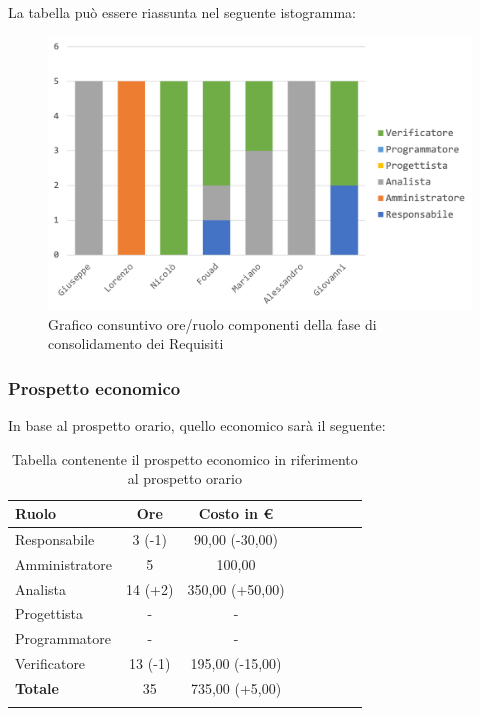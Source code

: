 			La tabella può essere riassunta nel seguente istogramma:
			
			\begin{figure}[H]
				\centering
				\includegraphics[width=0.8\linewidth]{images/consuntivo/ConsReqCons.png}
				\caption{Grafico consuntivo ore/ruolo componenti della fase di consolidamento dei Requisiti}
				\label{fig:consuntivo grafico suddivisione ruoli fase di consolidamento dei requisiti}
			\end{figure}
			
		\subsubsection{Prospetto economico}
			In base al prospetto orario, quello economico sarà il seguente: 
			
			\begin{longtable}{|l|c|c|c|c|c|c|c|}
				\hline
				\rowcolor{lighter-grayer}
				\textbf{Ruolo} & \textbf{Ore} & \textbf{Costo in €} \\
				\hline
				\endfirsthead
				
				\hline
				Responsabile & 3 (-1) & 90,00 (-30,00)\\
				\hline
				\hline
				Amministratore & 5 & 100,00\\
				\hline
				\hline
				Analista & 14 (+2) & 350,00 (+50,00)\\
				\hline
				\hline
				Progettista & - & -\\
				\hline
				\hline
				Programmatore & -  & -\\
				\hline
				\hline
				Verificatore & 13 (-1) & 195,00 (-15,00)\\
				\hline
				\textbf{Totale} & 35 & 735,00 (+5,00)\\
				\hline
				\caption{Tabella contenente il prospetto economico in riferimento al prospetto orario}
			\end{longtable}
			
